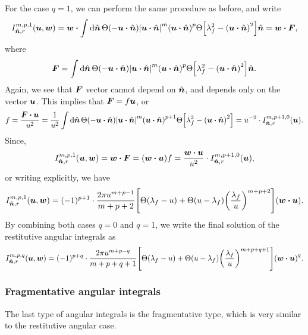 \documentclass[aps,prl,preprint,groupedaddress,10pt]{revtex4-2}
\begin{document}
For the case $q=1$, we can perform the same procedure as before, and write
\begin{equation}
    I_{\bn,r}^{m,p,1}\pqty{\bu,\bw}=\bw\vdot\int\dd{\bn}\Theta\pqty{-\bu\vdot\bn}
    \abs{\bu\vdot\bn}^m\pqty{\bu\vdot\bn}^p
    \Theta\bqty{\lambda_f^2-\pqty{\bu\vdot\bn}^2}\bn=\bw\vdot\bF,
\end{equation}
where
\begin{equation}
    \bF = \int\dd{\bn}\Theta\pqty{-\bu\vdot\bn}
    \abs{\bu\vdot\bn}^m\pqty{\bu\vdot\bn}^p
    \Theta\bqty{\lambda_f^2-\pqty{\bu\vdot\bn}^2}\bn.
\end{equation}
Again, we see that $\vb*{F}$ vector cannot depend on $\hat{\vb*{n}}$, and depends only on the vector
$\vb*{u}$. This implies that $\vb*{F}=f\vb*{u}$, or
\begin{equation}
    f=\frac{\bF\vdot\bu}{u^2}=\frac{1}{u^2}\int\dd{\bn}\Theta\pqty{-\bu\vdot\bn}
    \abs{\bu\vdot\bn}^m\pqty{\bu\vdot\bn}^{p+1}
    \Theta\bqty{\lambda_f^2-\pqty{\bu\vdot\bn}^2}=
    u^{-2}\cdot I_{\bn,r}^{m,p+1,0}(\bu).
\end{equation}
Since,
\begin{equation}
    I_{\bn,r}^{m,p,1}(\bu,\bw)=\bw\vdot\bF=\pqty{\bw\vdot\bu}f=
    \frac{\bw\vdot\bu}{u^2}\cdot I_{\bn,r}^{m,p+1,0}(\bu),
\end{equation}
or writing explicitly, we have
\begin{equation}
    I_{\bn,r}^{m,p,1}(\bu,\bw)=(-1)^{p+1}\cdot\frac{2\pi u^{m+p-1}}{m+p+2}
    \bqty{\Theta\pqty{\lambda_f-u}+\Theta\pqty{u-\lambda_f}
        \pqty{\frac{\lambda_f}{u}}^{m+p+2}}\pqty{\bw\vdot\bu}.
\end{equation}
By combining both cases $q=0$ and $q=1$, we write the final solution of the
restitutive angular integrals as
\begin{equation}
    I_{\bn,r}^{m,p,q}(\bu,\bw)=(-1)^{p+q}\cdot\frac{2\pi u^{m+p-q}}{m+p+q+1}
    \bqty{\Theta\pqty{\lambda_f-u}+\Theta\pqty{u-\lambda_f}
        \pqty{\frac{\lambda_f}{u}}^{m+p+q+1}}\pqty{\bw\vdot\bu}^q.
\end{equation}

\subsubsection{Fragmentative angular integrals}
The last type of angular integrals is the fragmentative type, which is very
similar to the restitutive angular case.
\end{document}

